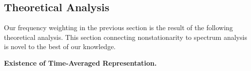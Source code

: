 \documentclass[sigconf,anonymous,review]{acmart}
\begin{document}
\subsection{Theoretical Analysis}\label{sec:Theoretical Analysis}


Our frequency weighting in the previous section is the result of the following theoretical analysis.
This section connecting nonstationarity to spectrum analysis is novel to the best of our knowledge.



\noindent\textbf{Existence of Time-Averaged Representation.}
\end{document}
